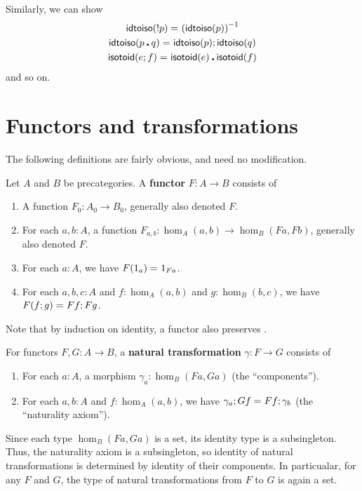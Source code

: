 Similarly, we can show
\begin{gather}
  \mathsf{idtoiso}(!{p}) =_{} {(\mathsf{idtoiso}(p))}^{-1}\\
  \mathsf{idtoiso}(p\centerdot q) =_{} \mathsf{idtoiso}(p);\mathsf{idtoiso}(q)\\
  \mathsf{isotoid}(e;f) =_{} \mathsf{isotoid}(e)\centerdot \mathsf{isotoid}(f)
\end{gather}
and so on.


\section{Functors and transformations}
\label{sec:transfors}

The following definitions are fairly obvious, and need no modification.

\begin{defn}\label{ct:functor}
  Let $A$ and $B$ be precategories.  A \textbf{functor} $F:A\to B$ consists of
  \begin{enumerate}
  \item A function $F_0:A_0\to B_0$, generally also denoted $F$.
  \item For each $a,b:A$, a function $F_{a,b}:\hom_A(a,b) \to \hom_B(Fa,Fb)$, generally also denoted $F$.
  \item For each $a:A$, we have $F(1_a) =_{} 1_{Fa}$.
  \item For each $a,b,c:A$ and $f:\hom_A(a,b)$ and $g:\hom_B(b,c)$, we have $F(f;g) =_{} Ff;Fg$.
  \end{enumerate}
\end{defn}

Note that by induction on identity, a functor also preserves \idtoiso.

\begin{defn}\label{ct:nattrans}
  For functors $F,G:A\to B$, a \textbf{natural transformation} $\gamma:F\to G$ consists of
  \begin{enumerate}
  \item For each $a:A$, a morphism $\gamma_a:\hom_B(Fa,Ga)$ (the ``components'').
  \item For each $a,b:A$ and $f:\hom_A(a,b)$, we have $\gamma_a;Gf =_{} Ff;\gamma_b$ (the ``naturality axiom'').
  \end{enumerate}
\end{defn}

Since each type $\hom_B(Fa,Ga)$ is a set, its identity type is a subsingleton.  Thus, the naturality axiom is a subsingleton, so identity of natural transformations is determined by identity of their components.
In particualar, for any $F$ and $G$, the type of natural transformations from $F$ to $G$ is again a set.

